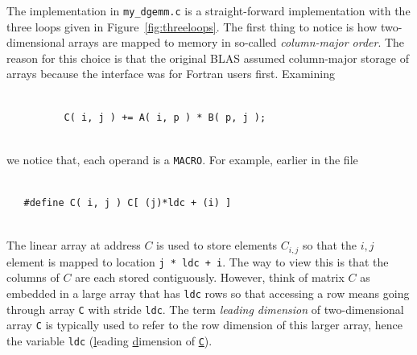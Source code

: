 The implementation in {\tt my\_dgemm.c} is a straight-forward implementation with the three loops given in Figure~\ref{fig:threeloops}.
The first thing to notice is how two-dimensional arrays are mapped to memory in so-called {\em column-major order}.  The reason for this choice is that the original BLAS assumed column-major storage of arrays because the interface was for Fortran users first.  
Examining
\begin{verbatim}

          C( i, j ) += A( i, p ) * B( p, j );
          
\end{verbatim}
we notice that, each operand is a {\tt MACRO}. For example, earlier in the file
\begin{verbatim}

   #define C( i, j ) C[ (j)*ldc + (i) ]
   
\end{verbatim}
The linear array at address $ C $ is used to store elements $ C_{i,j} $ so that the $ i,j $ element is mapped to location {\tt j * ldc + i}.  The way to view this is that the columns of $ C $ are each stored contiguously.  However, think of matrix $ C $ as embedded in a large array that has {\tt ldc} rows so that accessing a row means going through array {\tt C} with stride {\tt ldc}.  The term {\em leading dimension} of two-dimensional array {\tt C} is typically used to refer to the row dimension of this larger array, hence the variable {\tt ldc} (\underline{l}eading \underline{d}imension of \underline{\tt C}).

